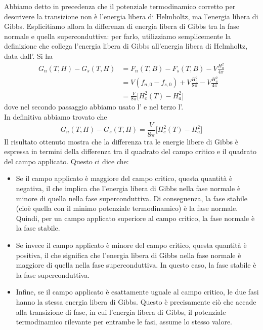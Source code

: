 Abbiamo detto in precedenza che il potenziale termodinamico corretto per descrivere la transizione non è l'energia libera di Helmholtz, ma l'energia libera di Gibbs. Esplicitiamo allora la differenza di energia libera di Gibbs tra la fase normale e quella superconduttiva: per farlo, utilizziamo semplicemente la definizione che collega l'energia libera di Gibbs all'energia libera di Helmholtz, data dall'. Si ha
\begin{equation*}
   \begin{split}
      G_n(T,H) - G_s(T,H)
      & =F_n(T,B) - F_s(T,B) - V\frac{H_a^2}{4\pi}
      \\
      & =V ( f_{n,0} - f_{s,0} ) + V \frac{H_a^2}{8\pi} - V\frac{H_a^2}{4\pi}
      \\
      & =\frac{V}{8\pi} \bigl[ H_c^2(T) - H_a^2 \bigr]
   \end{split}
\end{equation*}
dove nel secondo passaggio abbiamo usato l' e nel terzo l'.\\
In definitiva abbiamo trovato che
\begin{equation}
   G_n(T,H) - G_s(T,H)
   =\frac{V}{8\pi} \bigl[ H_c^2(T) - H_a^2 \bigr]
   \label{eq:differenza_Gibbs}
\end{equation}
Il risultato ottenuto mostra che la differenza tra le energie libere di Gibbs è espressa in termini della differenza tra il quadrato del campo critico e il quadrato del campo applicato. Questo ci dice che:
\begin{itemize}[leftmargin=0.5cm]
   \item Se il campo applicato è maggiore del campo critico, questa quantità è negativa, il che implica che l'energia libera di Gibbs nella fase normale è minore di quella nella fase superconduttiva. Di conseguenza, la fase stabile (cioè quella con il minimo potenziale termodinamico) è la fase normale. Quindi, per un campo applicato superiore al campo critico, la fase normale è la fase stabile.
   \item Se invece il campo applicato è minore del campo critico, questa quantità è positiva, il che significa che l'energia libera di Gibbs nella fase normale è maggiore di quella nella fase superconduttiva. In questo caso, la fase stabile è la fase superconduttiva.
   \item Infine, se il campo applicato è esattamente uguale al campo critico, le due fasi hanno la stessa energia libera di Gibbs. Questo è precisamente ciò che accade alla transizione di fase, in cui l'energia libera di Gibbs, il potenziale termodinamico rilevante per entrambe le fasi, assume lo stesso valore.
\end{itemize}
